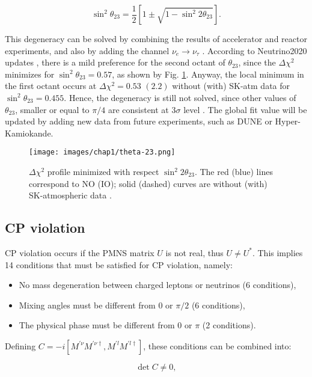 \begin{equation}
    \sin^2 \theta_{23} = \frac{1}{2}\left[1 \pm \sqrt{1-\sin^2 2\theta_{23}}\right].
\end{equation}

This degeneracy can be solved by combining the results of accelerator and reactor experiments, and also by adding the  channel $\nu_e \rightarrow \nu_\tau$ \cite{theta-23-first}. 
According to Neutrino2020 updates \cite{NuFIT-2020}, there is a mild preference for the second octant of $\theta_{23}$, since the $\Delta \chi^2$ minimizes for $\sin^2 \theta_{23} = 0.57$, as shown by Fig. \ref{fig:theta-23}. Anyway, the local minimum in the first octant occurs at $\Delta \chi^2 = 0.53$ $(2.2)$ without (with) SK-atm data for $\sin^2 \theta_{23} = 0.455$. Hence, the degeneracy is still not solved, since other values of $\theta_{23}$, smaller or equal to $\pi/4$ are consistent at $3\sigma$ level \cite{pdg:2022ynf}. The global fit value will be updated by adding new data from future experiments, such as DUNE or Hyper-Kamiokande.
\begin{figure}
    \centering
    \texttt{[image: images/chap1/theta-23.png]}
    \caption{$\Delta \chi^2$ profile minimized with respect $\sin^2 2\theta_{23}$. The red (blue) lines correspond to NO (IO); solid (dashed) curves are without (with) SK-atmospheric data \cite{NuFIT-2020}.}
    \label{fig:theta-23}
\end{figure}

\subsection{CP violation}
CP violation occurs if the PMNS matrix $U$ is not real, thus $U \neq U^*$. This implies 14 conditions that must be satisfied for CP violation, namely: 
\begin{itemize}
    \item No mass degeneration between charged leptons or neutrinos (6 conditions),
    \item Mixing angles must be different from 0 or $\pi/2$ (6 conditions),
    \item The physical phase must be different from 0 or $\pi$ (2 conditions).
\end{itemize}
Defining $C = -i[M^{'\nu}M^{'\nu\dag}, M^{'l}M^{'l\dag}]$, these conditions can be combined into:

\begin{equation}
    \det C \neq 0,
\end{equation}

